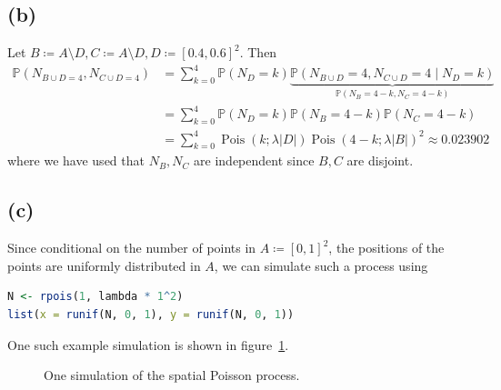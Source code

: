 \documentclass{article}
\DeclareMathOperator\Poisson{Pois}
\newcommand{\size}[1]{\lvert #1 \rvert}
\begin{document}
\subsection{(b)}
\begin{center}
\end{center}

Let $B \coloneqq A \setminus D, C \coloneqq A \setminus D, D \coloneqq [0.4, 0.6]^2$.
Then
\begin{align*}
	\mathbb P(N_{B \cup D = 4}, N_{C \cup D = 4}) &= \sum_{k=0}^4 \mathbb P(N_D = k) \underbrace{\mathbb P(N_{B \cup D} = 4, N_{C \cup D} = 4 \mid N_D = k)}_{\mathbb P(N_B = 4 - k, N_C = 4 - k)} \\
												  &= \sum_{k=0}^4 \mathbb P(N_D = k) \mathbb P(N_B = 4 - k) \mathbb P(N_C = 4 - k) \\
												  &= \sum_{k=0}^4 \Poisson(k; \lambda \size{D}) \Poisson(4 - k; \lambda \size{B})^2
												  \approx \num{0.023902}
\end{align*}
where we have used that $N_B, N_C$ are independent since $B, C$ are disjoint.

\subsection{(c)}
Since conditional on the number of points in $A \coloneqq [0, 1]^2$,
the positions of the points are uniformly distributed in $A$,
we can simulate such a process using
\begin{lstlisting}[language = R]
N <- rpois(1, lambda * 1^2)
list(x = runif(N, 0, 1), y = runif(N, 0, 1))
\end{lstlisting}
One such example simulation is shown in figure~\ref{fig:c_sim}.

\begin{figure}
	\centering
	
	\caption{One simulation of the spatial Poisson process. \label{fig:c_sim}}
\end{figure}
\end{document}
